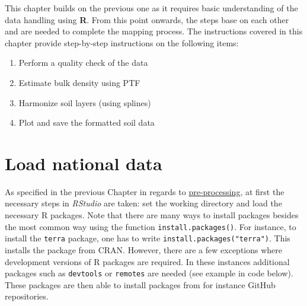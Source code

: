 \documentclass[
  10pt,
  b5paper,
  oneside]{book}
\providecommand{\tightlist}{%
  \setlength{\itemsep}{0pt}\setlength{\parskip}{0pt}}
\begin{document}
This chapter builds on the previous one as it requires basic understanding of the data handling using \textbf{R}. From this point onwards, the steps base on each other and are needed to complete the mapping process. The instructions covered in this chapter provide step-by-step instructions on the following items:

\begin{enumerate}
\def\labelenumi{\arabic{enumi}.}
\tightlist
\item
  Perform a quality check of the data
\item
  Estimate bulk density using PTF
\item
  Harmonize soil layers (using splines)
\item
  Plot and save the formatted soil data
\end{enumerate}

\hypertarget{load-national-data}{%
\section{Load national data}\label{load-national-data}}

As specified in the previous Chapter in regards to \href{preproc}{pre-processing}, at first the necessary steps in \emph{RStudio} are taken: set the working directory and load the necessary R packages. Note that there are many ways to install packages besides the most common way using the function \texttt{install.packages()}. For instance, to install the \texttt{terra} package, one has to write \texttt{install.packages("terra")}. This installs the package from CRAN. However, there are a few exceptions where development versions of R packages are required. In these instances additional packages such as \texttt{devtools} or \texttt{remotes} are needed (see example in code below). These packages are then able to install packages from for instance GitHub repositories.
\end{document}
